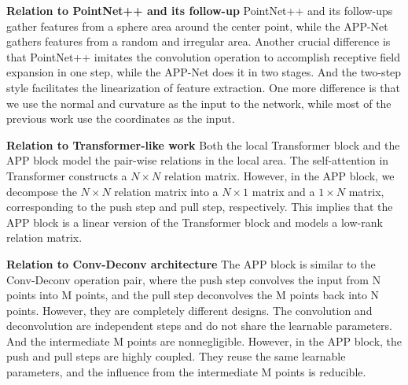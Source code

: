 \documentclass[journal]{IEEEtran}
\begin{document}
\noindent
{\bf Relation to PointNet++ and its follow-up} PointNet++ and its follow-ups gather features from a sphere area around the center point, while the APP-Net gathers features from a random and irregular area. Another crucial difference is that PointNet++ imitates the convolution operation to accomplish receptive field expansion in one step, while the APP-Net does it in two stages. And the two-step style facilitates the linearization of feature extraction. One more difference is that we use the normal and curvature as the input to the network, while most of the previous work use the coordinates as the input.



\noindent
{\bf Relation to Transformer-like work} Both the local Transformer block and the APP block model the pair-wise relations in the local area. The self-attention in Transformer constructs a $N\times N$ relation matrix. However, in the APP block, we decompose the $N\times N$ relation matrix into a $N\times 1$ matrix and a $1\times N$ matrix, corresponding to the push step and pull step, respectively. This implies that the APP block is a linear version of the Transformer block and models a low-rank relation matrix.


\noindent
{\bf Relation to Conv-Deconv architecture} The APP block is similar to the Conv-Deconv operation pair, where the push step convolves the input from N points into M points, and the pull step deconvolves the M points back into N points. However, they are completely different designs. The convolution and deconvolution are independent steps and do not share the learnable parameters. And the intermediate M points are nonnegligible. However, in the APP block, the push and pull steps are highly coupled. They reuse the same learnable parameters, and the influence from the intermediate M points is reducible.
\end{document}
